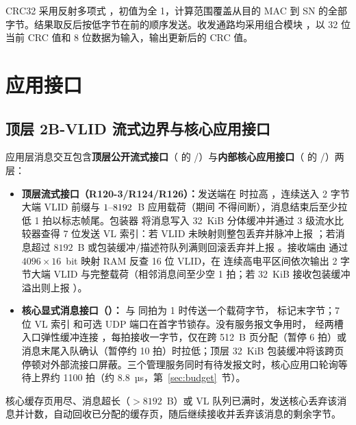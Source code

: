 CRC32 采用反射多项式 ，初值为全 1，计算范围覆盖从目的 MAC 到 SN 的全部字节。结果取反后按低字节在前的顺序发送。收发通路均采用组合模块 ，以 32 位当前 CRC 值和 8 位数据为输入，输出更新后的 CRC 值。

\section{应用接口}

\subsection{顶层 2B-VLID 流式边界与核心应用接口}

应用层消息交互包含\textbf{顶层公开流式接口}（ 的 /）与\textbf{内部核心应用接口}（ 的 /）两层：
\begin{itemize}[leftmargin=2em,itemsep=1pt]
  \item \textbf{顶层流式接口（R120-3/R124/R126）：}发送端在  时拉高 ，连续送入 2 字节大端 VLID 前缀与 $1\text{--}8192$~B 应用载荷（期间  不得间断），消息结束后至少拉低  1 拍以标志帧尾。包装器  将消息写入 32~KiB 分体缓冲并通过 3 级流水比较器查得 7 位发送 VL 索引：若 VLID 未映射则整包丢弃并脉冲上报 ；若消息超过 $8192$~B 或包装缓冲/描述符队列满则回滚丢弃并上报 。接收端由  通过 $4096\times 16$~bit 映射 RAM 反查 16 位 VLID，在  连续高电平区间依次输出 2 字节大端 VLID 与完整载荷（相邻消息间至少空 1 拍；若 32~KiB 接收包装缓冲溢出则上报 ）。
  \item \textbf{核心显式消息接口（）：} 与  同拍为 1 时传送一个载荷字节， 标记末字节；7 位 VL 索引  和可选 UDP 端口在首字节锁存。没有服务报文争用时， 经两槽入口弹性缓冲连接 ，每拍接收一字节，仅在跨 512~B 页分配（暂停 6 拍）或消息末尾入队确认（暂停约 10 拍）时拉低；顶层 32~KiB 包装缓冲将该跨页停顿对外部流接口屏蔽。三个管理服务同时有待发报文时，核心应用口轮询等待上界约 1100 拍（约 8.8~µs，第~\ref{sec:budget}~节）。
\end{itemize}

核心缓存页用尽、消息超长（$>8192$~B）或 VL 队列已满时，发送核心丢弃该消息并计数，自动回收已分配的缓存页，随后继续接收并丢弃该消息的剩余字节。

